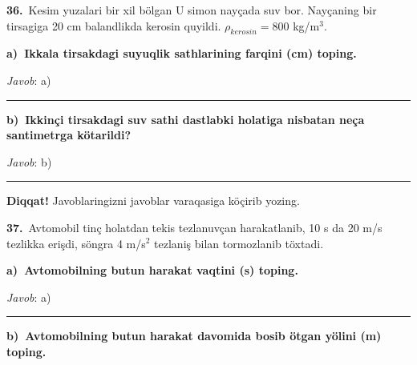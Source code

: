 \documentclass[11pt,a4paper]{article}
\newcommand{\blank}{\rule{5cm}{0.4pt}}
\begin{document}
\noindent{}\par\vspace{14pt}
\noindent\textbf{36.}\ Kesim yuzalari bir xil bölgan U simon nayçada suv bor. Nayçaning bir tirsagiga 20 cm balandlikda kerosin quyildi. $\rho_{kerosin}=800$ kg/m$^3$.\par\smallskip
\medskip\noindent\textbf{a)\ Ikkala tirsakdagi suyuqlik sathlarining farqini (cm) toping.}\par
\noindent\textit{Javob}: a)\ \blank\par
\medskip\noindent\textbf{b)\ Ikkinçi tirsakdagi suv sathi dastlabki holatiga nisbatan neça santimetrga kötarildi?}\par
\noindent\textit{Javob}: b)\ \blank\par
\medskip\noindent\textbf{Diqqat!} Javoblaringizni javoblar varaqasiga köçirib yozing.\par\vspace{10pt}
\noindent\textbf{37.}\ Avtomobil tinç holatdan tekis tezlanuvçan harakatlanib, 10 s da 20 m/s tezlikka erişdi, söngra 4 m/s$^2$ tezlaniş bilan tormozlanib töxtadi.\par\smallskip
\medskip\noindent\textbf{a)\ Avtomobilning butun harakat vaqtini (s) toping.}\par
\noindent\textit{Javob}: a)\ \blank\par
\medskip\noindent\textbf{b)\ Avtomobilning butun harakat davomida bosib ötgan yölini (m) toping.}\par
\end{document}
